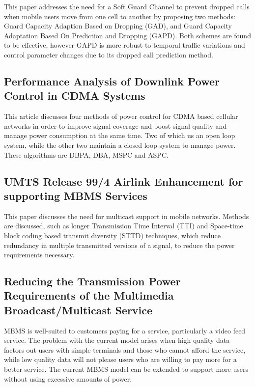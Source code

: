 \documentclass{article}
\begin{document}
This paper addresses the need for a Soft Guard Channel to prevent
dropped calls when mobile users move from one cell to another by
proposing two methods: Guard Capacity Adaption Based on Dropping
(GAD), and Guard Capacity Adaptation Based On Prediction and Dropping
(GAPD). Both schemes are found to be effective, however GAPD is more
robust to temporal traffic variations and control parameter changes
due to its dropped call prediction method.~\cite{wang2005adaptive}

\subsection{Performance Analysis of Downlink Power Control in CDMA
  Systems}

This article discusses four methods of power control for CDMA based
cellular networks in order to improve signal coverage and boost signal
quality and manage power consumption at the same time. Two of which us
an open loop system, while the other two maintain a closed loop system
to manage power. These algorithms are DBPA, DBA, MSPC and
ASPC.~\cite{das2003performance}

\subsection{UMTS Release 99/4 Airlink Enhancement for supporting MBMS
  Services}

This paper discusses the need for multicast support in mobile
networks. Methods are discussed, such as longer Transmission Time
Interval (TTI) and Space-time block coding based transmit diversity
(STTD) techniques, which reduce redundancy in multiple transmitted
versions of a signal, to reduce the power requirements
necessary.~\cite{chuah2004umts}

\subsection{Reducing the Transmission Power Requirements of the
  Multimedia Broadcast/Multicast Service}

MBMS is well-suited to customers paying for a service, particularly a
video feed service. The problem with the current model arises when
high quality data factors out users with simple terminals and those
who cannot afford the service, while low quality data will not please
users who are willing to pay more for a better service. The current
MBMS model can be extended to support more users without using
excessive amounts of power.~\cite{xylomenos2007reducing}
\end{document}
